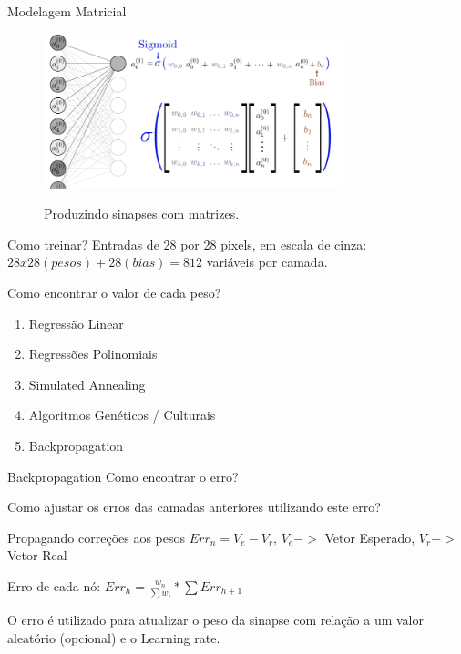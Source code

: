 \documentclass[compress]{beamer}
\begin{document}
\begin{frame}{Modelagem Matricial}
    \begin{figure}[h]
        \includegraphics[height=4.5cm]{img/matrix.png}
        
        Produzindo sinapses com matrizes\cite{BibEntry2018Jun}.
    \end{figure}
\end{frame}

\begin{frame}{Como treinar?}
    Entradas de 28 por 28 pixels, em escala de cinza: $28x28(pesos) + 28(bias) = 812$ variáveis por camada.
    
    Como encontrar o valor de cada peso?~\cite{BibEntry2018May}
    
    \begin{enumerate}
        \item Regressão Linear
        \item Regressões Polinomiais
        \item Simulated Annealing
        \item Algoritmos Genéticos / Culturais
        \item Backpropagation
    \end{enumerate}
\end{frame}

\begin{frame}{Backpropagation}
    Como encontrar o erro?
    
    Como ajustar os erros das camadas anteriores utilizando este erro?
\end{frame}

\begin{frame}{Propagando correções aos pesos}
    $Err_n = V_e - V_r$, $V_e -> $ Vetor Esperado, $V_r ->$ Vetor Real
    
    Erro de cada nó:
    $Err_h = \frac{w_n}{\sum{w_i}} * \sum{Err_{h+1}}$~\cite{BibEntry2018}
    
    O erro é utilizado para atualizar o peso da sinapse com relação a um valor aleatório (opcional) e o Learning rate.
\end{frame}
\end{document}
